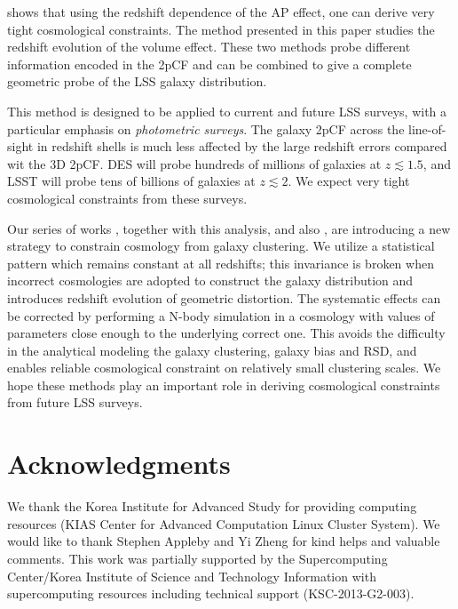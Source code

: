 \documentclass[iop]{emulateapj}
\begin{document}
 

\cite{Li2015,Li2016} shows that using the redshift dependence of the AP effect, 
one can derive very tight cosmological constraints.
The method presented in this paper studies the redshift evolution of the volume effect.
These two methods probe different information encoded in the 2pCF 
and can be combined to give a complete geometric probe of the LSS galaxy distribution.

This method is designed to be applied to current and future LSS surveys,
with a particular emphasis on {\it photometric surveys}.
The galaxy 2pCF across the line-of-sight in redshift shells is much less affected by the large redshift errors compared wit the 3D 2pCF.
DES will probe hundreds of millions of galaxies at $z\lesssim1.5$, 
and LSST will probe tens of billions of galaxies at $z\lesssim2$.
We expect very tight cosmological constraints from these surveys.


Our series of works \cite{Li2014,Li2015,Li2016}, together with this analysis, 
and also \cite{topology,MS2016},
are introducing a new strategy to constrain cosmology from galaxy clustering.
We utilize a statistical pattern which remains constant at all redshifts;
this invariance is broken when incorrect cosmologies are adopted to construct the galaxy distribution
and introduces redshift evolution of geometric distortion.
The systematic effects can be corrected by performing a N-body simulation 
in a cosmology with values of parameters close enough to the underlying correct one.
This avoids the difficulty in the analytical modeling the galaxy clustering, galaxy bias and RSD,
and enables reliable cosmological constraint on relatively small clustering scales.
We hope these methods play an important role in deriving cosmological constraints from future LSS surveys.

 
 
\section*{Acknowledgments}

We thank the Korea Institute for Advanced Study for providing computing resources (KIAS Center for Advanced Computation Linux Cluster System).
We would like to thank Stephen Appleby and Yi Zheng for kind helps and valuable comments.
This work was partially supported by the
Supercomputing Center/Korea Institute of Science and
Technology Information with supercomputing resources
including technical support (KSC-2013-G2-003).
\end{document}
